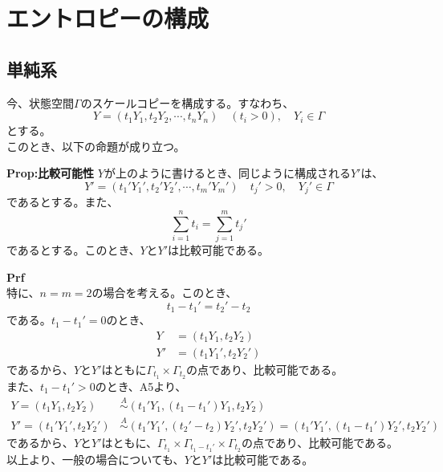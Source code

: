 \documentclass[a4paper,11pt]{jsarticle}
\numberwithin{equation}{section}
\begin{document}
\section{エントロピーの構成}
\subsection{単純系}
今、状態空間$\Gamma$のスケールコピーを構成する。すなわち、
\begin{equation}
    Y =(t_1 Y_1,t_2 Y_2,\cdots,t_n Y_n) \quad (t_i>0), \quad Y_i \in \Gamma
\end{equation}
とする。\\
このとき、以下の命題が成り立つ。
\begin{itembox}[l]{\textbf{Prop:比較可能性}}
    $Y$が上のように書けるとき、同じように構成される$Y'$は、
    \begin{equation}
        Y' =(t_1' Y_1',t_2' Y_2',\cdots,t_m' Y_m') \quad t_j'>0, \quad Y_j' \in \Gamma
    \end{equation}
    であるとする。また、
    \begin{equation}
        \sum_{i=1}^n t_i = \sum_{j=1}^m t_j'
    \end{equation}
    であるとする。このとき、$Y$と$Y'$は比較可能である。
\end{itembox}
\textbf{Prf}\\
特に、$n=m=2$の場合を考える。このとき、
\begin{equation}
    t_1-t_1' = t_2'-t_2
\end{equation}
である。$t_1-t_1' =0$のとき、
\begin{align}
    Y &= (t_1 Y_1,t_2 Y_2)\\
    Y' &= (t_1 Y_1',t_2 Y_2')
\end{align}
であるから、$Y$と$Y'$はともに$\Gamma _{t_1} \times \Gamma _{t_2}$の点であり、比較可能である。\\
また、$t_1-t_1' >0$のとき、A5より、
\begin{align}
    Y=(t_1 Y_1,t_2 Y_2) &\overset{A}{\sim} (t_1' Y_1,(t_1-t_1')Y_1,t_2 Y_2)\\
    Y'=(t_1' Y_1',t_2 Y_2') &\overset{A}{\sim} (t_1' Y_1',(t_2'-t_2)Y_2',t_2 Y_2')=(t_1' Y_1',(t_1-t_1')Y_2',t_2 Y_2')
\end{align}
であるから、$Y$と$Y'$はともに、$\Gamma _{t_1} \times \Gamma _{t_1-t_1'} \times \Gamma _{t_2}$の点であり、比較可能である。\\
以上より、一般の場合についても、$Y$と$Y'$は比較可能である。\hfill\qedsymbol\\
\end{document}
